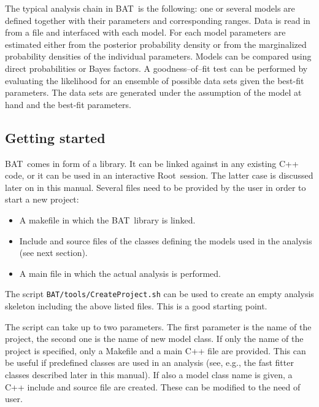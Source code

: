 \documentclass[11pt, a4paper]{article}
\newcommand{\bat}{{\sc BAT}}
\newcommand{\Root}{{\sc Root}}
\begin{document}
The typical analysis chain in \bat\ is the following: one or several
models are defined together with their parameters and corresponding
ranges. Data is read in from a file and interfaced with each
model. For each model parameters are estimated either from the
posterior probability density or from the marginalized probability
densities of the individual parameters. Models can be compared using
direct probabilities or Bayes factors. A goodness--of--fit test can be
performed by evaluating the likelihood for an ensemble of possible
data sets given the best-fit parameters. The data sets are generated
under the assumption of the model at hand and the best-fit
parameters.


\subsection{Getting started}
\label{subsection:start}

\bat\ comes in form of a library. It can be linked against in any
existing C++ code, or it can be used in an interactive
\Root\ session. The latter case is discussed later on in this
manual. Several files need to be provided by the user in order to
start a new project:
%
\begin{itemize}
\item A makefile in which the \bat\ library is linked.
\item Include and source files of the classes defining the models
used in the analysis (see next section).
\item A main file in which the actual analysis is performed.
\end{itemize}
%
The script \verb|BAT/tools/CreateProject.sh| can be used to create an
empty analysis skeleton including the above listed files. This is a
good starting point.

The script can take up to two parameters. The first parameter is the
name of the project, the second one is the name of new model class. If
only the name of the project is specified, only a Makefile and a main
C++ file are provided. This can be useful if predefined classes are
used in an analysis (see, e.g., the fast fitter classes described
later in this manual). If also a model class name is given, a C++
include and source file are created. These can be modified to the need
of user.
\end{document}
